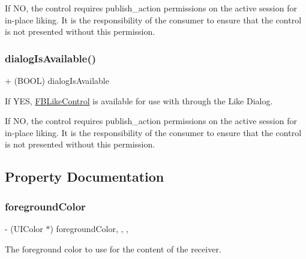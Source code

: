If NO, the control requires publish\+\_\+action permissions on the active session for in-\/place liking. It is the responsibility of the consumer to ensure that the control is not presented without this permission. \mbox{\label{interfaceFBLikeControl_a31182182d8e02669ba4bc6cec96e9111}} 
\subsubsection{\texorpdfstring{dialog\+Is\+Available()}{dialogIsAvailable()}\hspace{0.1cm}{\footnotesize\ttfamily [5/5]}}
{\footnotesize\ttfamily + (B\+O\+OL) dialog\+Is\+Available \begin{DoxyParamCaption}{ }\end{DoxyParamCaption}}

If Y\+ES, \hyperlink{interfaceFBLikeControl}{F\+B\+Like\+Control} is available for use with through the Like Dialog.

If NO, the control requires publish\+\_\+action permissions on the active session for in-\/place liking. It is the responsibility of the consumer to ensure that the control is not presented without this permission. 

\subsection{Property Documentation}
\mbox{\label{interfaceFBLikeControl_a8c6fc0940bee39d9838e8ed10225975e}} 
\subsubsection{\texorpdfstring{foreground\+Color}{foregroundColor}}
{\footnotesize\ttfamily -\/ (U\+I\+Color $\ast$) foreground\+Color\hspace{0.3cm}{\ttfamily [read]}, {\ttfamily [write]}, {\ttfamily [nonatomic]}, {\ttfamily [strong]}}

The foreground color to use for the content of the receiver. \mbox{\label{interfaceFBLikeControl_a65c29f2c40041e2c0cc373edc79a8c9e}} 
